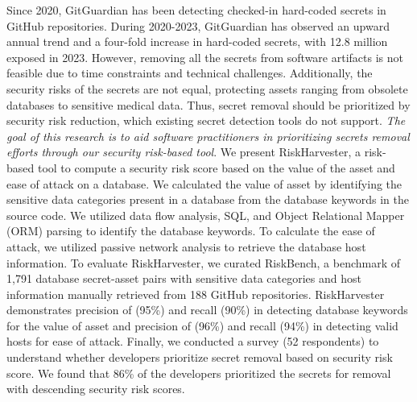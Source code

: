 Since 2020, GitGuardian has been detecting checked-in hard-coded secrets in GitHub repositories. During 2020-2023, GitGuardian has observed an upward annual trend and a four-fold increase in hard-coded secrets, with 12.8 million exposed in 2023. However, removing all the secrets from software artifacts is not feasible due to time constraints and technical challenges. Additionally, the security risks of the secrets are not equal, protecting assets ranging from obsolete databases to sensitive medical data. Thus, secret removal should be prioritized by security risk reduction, which existing secret detection tools do not support. \textit{The goal of this research is to aid software practitioners in prioritizing secrets removal efforts through our security risk-based tool}. We present RiskHarvester, a risk-based tool to compute a security risk score based on the value of the asset and ease of attack on a database. We calculated the value of asset by identifying the sensitive data categories present in a database from the database keywords in the source code. We utilized data flow analysis, SQL, and Object Relational Mapper (ORM) parsing to identify the database keywords. To calculate the ease of attack, we utilized passive network analysis to retrieve the database host information. To evaluate RiskHarvester, we curated RiskBench, a benchmark of 1,791 database secret-asset pairs with sensitive data categories and host information manually retrieved from 188 GitHub repositories. RiskHarvester demonstrates precision of (95\%) and recall (90\%) in detecting database keywords for the value of asset and precision of (96\%) and recall (94\%) in detecting valid hosts for ease of attack. Finally, we conducted a survey (52 respondents) to understand whether developers prioritize secret removal based on security risk score. We found that 86\% of the developers prioritized the secrets for removal with descending security risk scores.